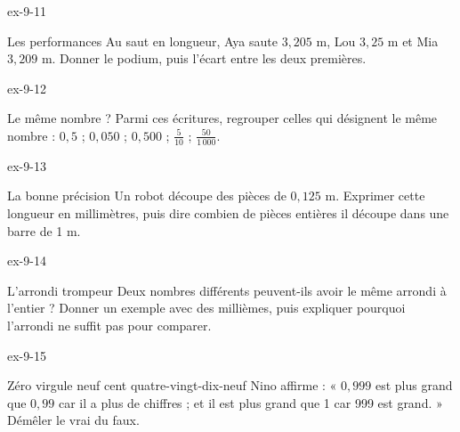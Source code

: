 \begin{blocLivre}{ex-9-11}\begin{exercice}[3]{Les performances}
Au saut en longueur, Aya saute $3{,}205$ m, Lou $3{,}25$ m et Mia $3{,}209$ m. Donner le podium, puis l’écart entre les deux premières.
\end{exercice}\end{blocLivre}
\begin{blocLivre}{ex-9-12}\begin{exercice}[3]{Le même nombre ?}
Parmi ces écritures, regrouper celles qui désignent le même nombre : $0{,}5$ ; $0{,}050$ ; $0{,}500$ ; $\frac5{10}$ ; $\frac{50}{1\,000}$.
\end{exercice}\end{blocLivre}
\begin{blocLivre}{ex-9-13}\begin{exercice}[3]{La bonne précision}
Un robot découpe des pièces de $0{,}125$ m. Exprimer cette longueur en millimètres, puis dire combien de pièces entières il découpe dans une barre de 1 m.
\end{exercice}\end{blocLivre}
\begin{blocLivre}{ex-9-14}\begin{exercice}[3]{L’arrondi trompeur}
Deux nombres différents peuvent-ils avoir le même arrondi à l’entier ? Donner un exemple avec des millièmes, puis expliquer pourquoi l’arrondi ne suffit pas pour comparer.
\end{exercice}\end{blocLivre}
\begin{blocLivre}{ex-9-15}\begin{exercice}[3]{Zéro virgule neuf cent quatre-vingt-dix-neuf}
Nino affirme : « $0{,}999$ est plus grand que $0{,}99$ car il a plus de chiffres ; et il est plus grand que 1 car 999 est grand. » Démêler le vrai du faux.
\end{exercice}\end{blocLivre}

\clearpage
